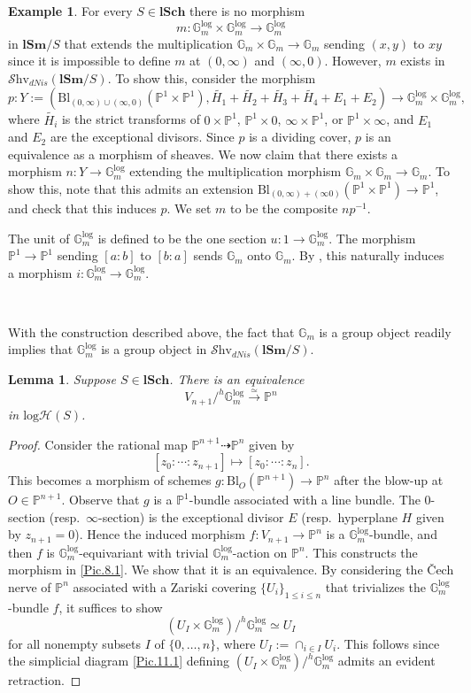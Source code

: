 \documentclass[11pt, a4paper]{amsart}
\newtheorem{lem}[thm]{Lemma}
\theoremstyle{definition}
\newtheorem{exm}[thm]{Example}
\numberwithin{equation}{subsection}
\renewcommand{\P}{\mathbb{P}}
\newcommand{\G}{{\mathbb{G}}}
\newcommand{\lSch}{\mathbf{lSch}}
\newcommand{\lSm}{\mathbf{lSm}}
\newcommand{\Blow}{{\mathrm{Bl}}}
\newcommand{\Gmm}{\mathbb{G}_m^{\mathrm{log}}}
\newcommand{\cptsph}[1]{V_{#1}}
\newcommand{\infShv}{\mathcal{S}\mathrm{hv}}
\newcommand{\inflogH}{\mathrm{log}\mathcal{H}}
\begin{document}
\begin{exm}
\label{Ori.73}
For every $S\in \lSch$ there is no morphism
\[
m \colon \Gmm\times \Gmm \to \Gmm
\]
in $\lSm/S$ that extends the multiplication $\G_m\times \G_m\to \G_m$ sending $(x,y)$ to $xy$
since it is impossible to define $m$ at $(0,\infty)$ and $(\infty,0)$.
However, $m$ exists in $\infShv_{dNis}(\lSm/S)$.
To show this, consider the morphism
\[
p\colon Y:= 
(\Blow_{(0,\infty)\cup 
(\infty,0)}(\P^1\times \P^1),\widetilde{H_1}+\widetilde{H_2}+\widetilde{H_3}+\widetilde{H_4}+E_1+E_2) 
\to 
\Gmm\times \Gmm,
\]
where $\widetilde{H_i}$ is the strict transforms of $0\times \P^1$, $\P^1\times 0$, $\infty\times \P^1$, 
or $\P^1\times \infty$, and $E_1$ and $E_2$ are the exceptional divisors.
Since $p$ is a dividing cover,
$p$ is an equivalence as a morphism of sheaves.
We now claim that there  exists a morphism $n\colon Y\to \Gmm$ extending the multiplication morphism $\G_m\times \G_m\to \G_m$.
To show this,
note that this admits an extension $\Blow_{(0,\infty)+ (\infty 0)}(\P^1\times \P^1)\to \P^1$,
and check that
this induces $p$.
We set $m$ to be the composite $np^{-1}$.


The unit of $\Gmm$ is defined to be the one section $u\colon 1\to \Gmm$.
The morphism $\P^1\to \P^1$ sending $[a:b]$ to $[b:a]$ sends $\G_m$ onto $\G_m$.
By \cite[Proposition III.1.6.2]{Ogu}, this naturally induces a morphism $i\colon \Gmm\to \Gmm$.

\

With the construction described above, the fact that $\G_m$ is a group object readily implies that $\Gmm$ is a group object in $\infShv_{dNis}(\lSm/S)$.
\end{exm}


\begin{lem}
\label{Pic.8}
Suppose $S\in \lSch$.
There is an equivalence
\begin{equation}
\label{Pic.8.1}
\cptsph{n+1}/^h \Gmm
\xrightarrow{\simeq}
\P^n
\end{equation}
in $\inflogH(S)$.
\end{lem}
\begin{proof}
Consider the rational map $\P^{n+1}\dashrightarrow \P^n$ given by
\[
[z_0:\cdots:z_{n+1}]
\mapsto
[z_0:\cdots:z_n].
\]
This becomes a morphism of schemes $g\colon \Blow_O(\P^{n+1})\to \P^n$ after the blow-up at $O\in \P^{n+1}$.
Observe that $g$ is a $\P^1$-bundle associated with a line bundle.
The $0$-section (resp.\ $\infty$-section)
is the exceptional divisor $E$ (resp.\ hyperplane $H$ given by $z_{n+1}=0$).
Hence the induced morphism $f\colon V_{n+1}\to \P^n$ is a $\Gmm$-bundle,
and then $f$ is $\Gmm$-equivariant with trivial $\Gmm$-action on $\P^n$.
This constructs the morphism in \eqref{Pic.8.1}.
We show that it is an equivalence.
By considering the \v{C}ech nerve of $\P^n$ associated with a Zariski covering $\{U_i\}_{1\leq i\leq n}$ that trivializes the $\Gmm$-bundle $f$,
it suffices to show
\[
(U_I\times \Gmm)/^h \Gmm \simeq U_I
\]
for all nonempty subsets $I$ of $\{0,\ldots,n\}$,
where $U_I:=\cap_{i\in I}U_i$.
This follows since the simplicial diagram \eqref{Pic.11.1} defining $(U_I\times \Gmm)/^h \Gmm$ 
admits an evident retraction.
\end{proof}
\end{document}

